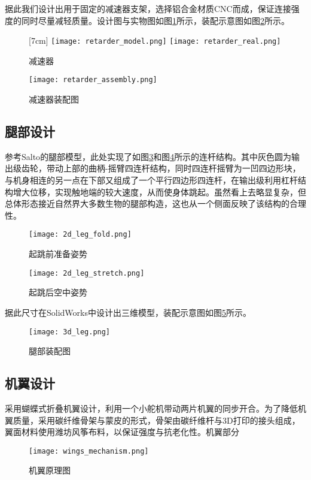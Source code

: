 据此我们设计出用于固定的减速器支架，选择铝合金材质CNC而成，保证连接强度的同时尽量减轻质量。设计图与实物图如图\ref{fig:retarder}所示，装配示意图如图\ref{fig:retarder_assembly}所示。
\begin{figure}[H]
  \centering
  [7cm] 
    {\texttt{[image: retarder\_model.png]}}
  \hspace{4em}
      {\texttt{[image: retarder\_real.png]}}
  \caption{减速器}
  \label{fig:retarder}
\end{figure}
\begin{figure}[H]
  \centering%
  \texttt{[image: retarder\_assembly.png]}
  \caption{减速器装配图}
  \label{fig:retarder_assembly}
\end{figure}
\subsection{腿部设计}
参考Salto\cite{Salto}的腿部模型，此处实现了如图\ref{fig:2d_leg_fold}和图\ref{fig:2d_leg_stretch}所示的连杆结构。其中灰色圆为输出级齿轮，带动上部的曲柄-摇臂四连杆结构，同时四连杆摇臂为一凹四边形块，与机身相连的另一点在下部又组成了一个平行四边形四连杆，在输出级利用杠杆结构增大位移，实现触地端的较大速度，从而使身体跳起。虽然看上去略显复杂，但总体形态接近自然界大多数生物的腿部构造，这也从一个侧面反映了该结构的合理性。

\begin{figure}[H]
  \centering%
  \texttt{[image: 2d\_leg\_fold.png]}
  \caption{起跳前准备姿势}
  \label{fig:2d_leg_fold}
\end{figure}
\begin{figure}[H]
  \centering%
  \texttt{[image: 2d\_leg\_stretch.png]}
  \caption{起跳后空中姿势}
  \label{fig:2d_leg_stretch}
\end{figure}

据此尺寸在SolidWorks中设计出三维模型，装配示意图如图\ref{fig:3d_leg}所示。
\begin{figure}[H]
  \centering%
  \texttt{[image: 3d\_leg.png]}
  \caption{腿部装配图}
  \label{fig:3d_leg}
\end{figure}

\subsection{机翼设计}
\label{sec:wings}
采用蝴蝶式\cite{EPFL}折叠机翼设计，利用一个小舵机带动两片机翼的同步开合。为了降低机翼质量，采用碳纤维骨架与蒙皮的形式，骨架由碳纤维杆与3D打印的接头组成，翼面材料使用潍坊风筝布料，以保证强度与抗老化性。机翼部分
\begin{figure}[H]
  \centering%
  \texttt{[image: wings\_mechanism.png]}
  \caption{机翼原理图}
  \label{fig:wings_mechanism}
\end{figure}
